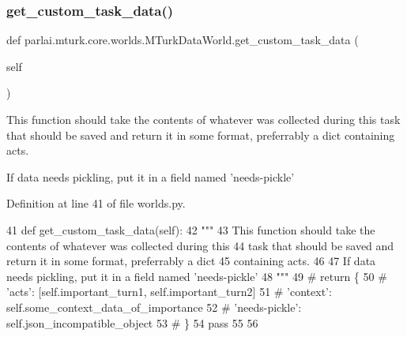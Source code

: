 \subsubsection{\texorpdfstring{get\+\_\+custom\+\_\+task\+\_\+data()}{get\_custom\_task\_data()}}
{\footnotesize\ttfamily def parlai.\+mturk.\+core.\+worlds.\+M\+Turk\+Data\+World.\+get\+\_\+custom\+\_\+task\+\_\+data (\begin{DoxyParamCaption}\item[{}]{self }\end{DoxyParamCaption})}

\begin{DoxyVerb}This function should take the contents of whatever was collected during this
task that should be saved and return it in some format, preferrably a dict
containing acts.

If data needs pickling, put it in a field named 'needs-pickle'
\end{DoxyVerb}
 

Definition at line 41 of file worlds.\+py.


\begin{DoxyCode}
41     \textcolor{keyword}{def }get\_custom\_task\_data(self):
42         \textcolor{stringliteral}{"""}
43 \textcolor{stringliteral}{        This function should take the contents of whatever was collected during this}
44 \textcolor{stringliteral}{        task that should be saved and return it in some format, preferrably a dict}
45 \textcolor{stringliteral}{        containing acts.}
46 \textcolor{stringliteral}{}
47 \textcolor{stringliteral}{        If data needs pickling, put it in a field named 'needs-pickle'}
48 \textcolor{stringliteral}{        """}
49         \textcolor{comment}{# return \{}
50         \textcolor{comment}{#     'acts': [self.important\_turn1, self.important\_turn2]}
51         \textcolor{comment}{#     'context': self.some\_context\_data\_of\_importance}
52         \textcolor{comment}{#     'needs-pickle': self.json\_incompatible\_object}
53         \textcolor{comment}{# \}}
54         \textcolor{keywordflow}{pass}
55 
56 
\end{DoxyCode}
\mbox{\label{classparlai_1_1mturk_1_1core_1_1worlds_1_1MTurkDataWorld_a13f5b85f9694627df2e181267588d4dc}} 
